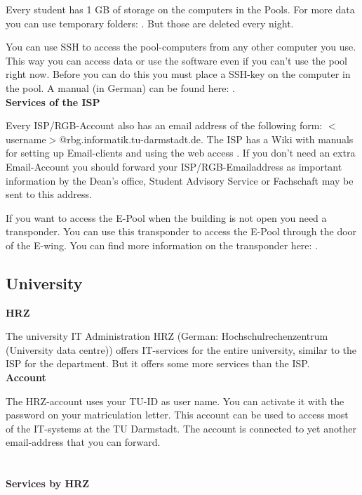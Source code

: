 {    Every student has 1 GB of storage on the computers in the Pools. For more data you can use temporary folders: \footnotemark[5]. But those are deleted every night.

    You can use SSH \footnotemark[6] to access the pool-computers from any other computer you use. This way you can access data or use the software even if you can't use the pool right now. Before you can do this you must place a SSH-key on the computer in the pool. A manual (in German) can be found here: \footnotemark[6].\\

    \noindent\textbf{Services of the ISP}

    Every ISP/RGB-Account also has an email address of the following form: $<$username$>$@rbg.informatik.tu-darmstadt.de. The ISP has a Wiki with manuals for setting up Email-clients \footnotemark[7] and using the web access \footnotemark[8]. If you don't need an extra Email-Account you should forward your ISP/RGB-Emailaddress \footnotemark[7] as important information by the Dean's office, Student Advisory Service or Fachschaft may be sent to this address.

    If you want to access the E-Pool when the building is not open you need a transponder. You can use this transponder to access the E-Pool through the door of the E-wing. You can find more information on the transponder here: \footnotemark[9].\\


    \subsection*{University}

    \noindent\textbf{HRZ}

    The university IT Administration HRZ (German: Hochschulrechenzentrum (University data centre)) \footnotemark[10] offers IT-services for the entire university, similar to the ISP for the department. But it offers some more services than the ISP.\\

    \noindent\textbf{Account}

    The HRZ-account uses your TU-ID as user name. You can activate it with the password on your matriculation letter. This account can be used to access most of the IT-systems at the TU Darmstadt. The account is connected to yet another email-address that you can forward. \footnotemark[11]\\
    \\\\
    \noindent\textbf{Services by HRZ}

}
